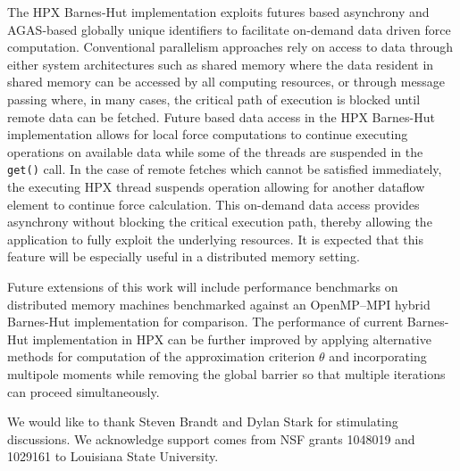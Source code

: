 \documentclass[floatfix]{revtex4}
\begin{document}
The HPX Barnes-Hut implementation exploits futures based asynchrony and AGAS-based
globally unique identifiers to facilitate on-demand data driven force computation. Conventional parallelism approaches
rely on access to data through either system architectures such as shared memory where the data resident in shared
memory can be accessed by all computing resources, or through message passing where, in many cases, the critical
path of execution is blocked until remote data can be fetched.
Future based data access in the HPX Barnes-Hut implementation
allows for local force computations to continue executing operations on
available data while some of the threads are suspended in the {\tt get()}
call.
In the case of remote fetches which cannot be satisfied immediately, the executing HPX thread suspends
operation allowing for another dataflow element to continue force calculation. This on-demand data access provides
asynchrony without blocking the critical execution path, thereby allowing the 
application to fully exploit the underlying resources. It is expected that this feature will be especially useful in a distributed memory setting.

Future extensions of this work will include performance benchmarks on distributed memory machines benchmarked against an
OpenMP--MPI hybrid Barnes-Hut implementation for comparison. 
The performance of current Barnes-Hut implementation in HPX can be further 
improved by applying alternative methods for computation of the 
approximation criterion $\theta$ 
and incorporating multipole moments while removing the global 
barrier so that multiple iterations can proceed simultaneously. 

We would like to thank Steven Brandt and Dylan Stark for stimulating discussions.
We acknowledge support comes from NSF grants 1048019 and 1029161 
to Louisiana State University.



\end{document}
